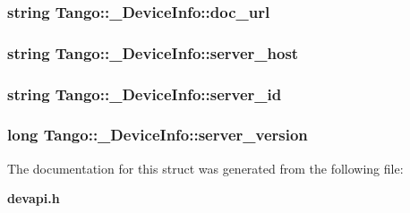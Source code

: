 \subsubsection[{doc\-\_\-url}]{\setlength{\rightskip}{0pt plus 5cm}string Tango\-::\-\_\-\-Device\-Info\-::doc\-\_\-url}\label{structTango_1_1__DeviceInfo_a437472a3c6a1dbbbf7125180577e3e88}
\subsubsection[{server\-\_\-host}]{\setlength{\rightskip}{0pt plus 5cm}string Tango\-::\-\_\-\-Device\-Info\-::server\-\_\-host}\label{structTango_1_1__DeviceInfo_a161e8a72fc4ee3812548f95ef9f1c209}
\subsubsection[{server\-\_\-id}]{\setlength{\rightskip}{0pt plus 5cm}string Tango\-::\-\_\-\-Device\-Info\-::server\-\_\-id}\label{structTango_1_1__DeviceInfo_a2e7d98036dafa968ebef16982f49677b}
\subsubsection[{server\-\_\-version}]{\setlength{\rightskip}{0pt plus 5cm}long Tango\-::\-\_\-\-Device\-Info\-::server\-\_\-version}\label{structTango_1_1__DeviceInfo_a45899619243d8a7e3a91fe46a6db12b3}


The documentation for this struct was generated from the following file\-:\begin{DoxyCompactItemize}
\item 
{\bf devapi.\-h}\end{DoxyCompactItemize}
